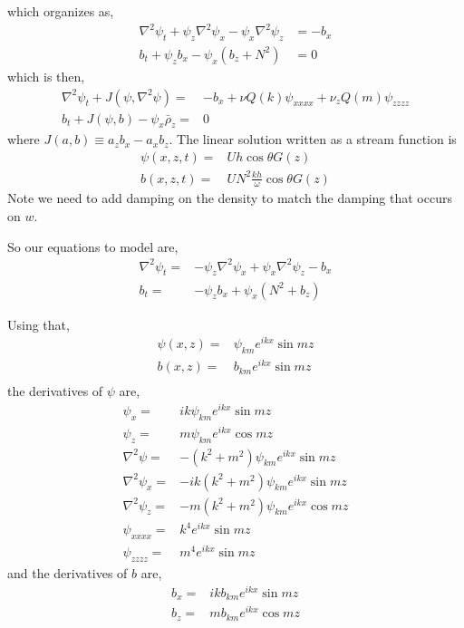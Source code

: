 \documentclass[11pt]{article}
\begin{document}
which organizes as,
\begin{subequations}{}
\begin{align} \nonumber
\nabla^2 \psi_t+ \psi_z \nabla^2 \psi_{x} -\psi_x \nabla^2 \psi_{z}  &= - b_x \\
b_t + \psi_z b_x - \psi_x ( b_z + N^2 ) &= 0
\end{align}
\end{subequations}
which is then,
\begin{subequations}{}
\begin{align}
\label{streamfunction_equation}
\nabla^2 \psi_t +  J\left( \psi, \nabla^2 \psi \right) =& -b_x + \nu Q(k) \psi_{xxxx} + \nu_z Q(m) \psi_{zzzz} \\ \label{rho_equation}
b_t + J\left( \psi, b \right)  -\psi_x \bar{\rho}_z =& 0
\end{align}
\end{subequations}
where $J(a,b) \equiv a_z b_x - a_x b_z$. The linear solution written as a stream function is
\begin{align}
\label{linear_streamfunction}
\psi(x,z,t) =& U h \cos \theta G(z) \\
b(x,z,t) =& U N^2 \frac{kh}{\omega} \cos \theta G(z)
\end{align}
Note we need to add damping on the density to match the damping that occurs on $w$.

So our equations to model are,
\begin{subequations}{}
\begin{align}
\nabla^2 \psi_t =& -  \psi_z \nabla^2 \psi_x +  \psi_x \nabla^2 \psi_z  -b_x \\ 
b_t =& -\psi_z b_x + \psi_x (N^2 + b_z) 
\end{align}
\end{subequations}

Using that,
\begin{align}
\psi(x,z) =& \psi_{km} e^{ikx} \sin mz \\
b(x,z) =& b_{km} e^{ikx} \sin mz \\
\end{align}
the derivatives of $\psi$ are,
\begin{align}
\psi_x =& ik\psi_{km} e^{ikx} \sin mz \\
\psi_z =& m \psi_{km} e^{ikx} \cos mz \\
\nabla^2 \psi =& -(k^2 + m^2) \psi_{km} e^{ikx} \sin mz \\
\nabla^2 \psi_x =& -i k (k^2 + m^2) \psi_{km} e^{ikx} \sin mz \\
\nabla^2 \psi_z =& -m (k^2 + m^2) \psi_{km} e^{ikx} \cos mz  \\
\psi_{xxxx} = & k^4 e^{ikx} \sin mz \\
\psi_{zzzz} = & m^4 e^{ikx} \sin mz
\end{align}
and the derivatives of $b$ are,
\begin{align}
b_x =& ik b_{km} e^{ikx} \sin mz \\
b_z =& m b_{km} e^{ikx} \cos mz
\end{align}
\end{document}
